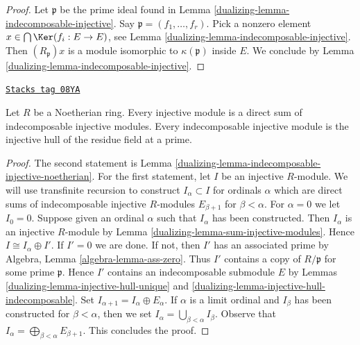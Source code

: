 \begin{proof}

Let $\mathfrak p$ be the prime ideal found in
Lemma \ref{dualizing-lemma-indecomposable-injective}.
Say $\mathfrak p = (f_1, \ldots, f_r)$.
Pick a nonzero element $x \in \bigcap \Ker(f_i : E \to E)$,
see Lemma \ref{dualizing-lemma-indecomposable-injective}.
Then $(R_\mathfrak p)x$ is a module isomorphic to $\kappa(\mathfrak p)$
inside $E$. We conclude by Lemma \ref{dualizing-lemma-indecomposable-injective}.
\end{proof}

\begin{proposition}

\label{dualizing-proposition-structure-injectives-noetherian}
\href{https://stacks.math.columbia.edu/tag/08YA}{\texttt{Stacks tag 08YA}}

Let $R$ be a Noetherian ring.
Every injective module is a direct sum of indecomposable injective modules.
Every indecomposable injective module is the injective hull of
the residue field at a prime.
\end{proposition}

\begin{proof}

The second statement is Lemma \ref{dualizing-lemma-indecomposable-injective-noetherian}.
For the first statement, let $I$ be an injective $R$-module.
We will use transfinite recursion to construct $I_\alpha \subset I$
for ordinals $\alpha$ which are direct sums of indecomposable injective
$R$-modules $E_{\beta + 1}$ for $\beta < \alpha$.
For $\alpha = 0$ we let $I_0 = 0$. Suppose given an ordinal $\alpha$
such that $I_\alpha$ has been constructed. Then $I_\alpha$ is an
injective $R$-module by Lemma \ref{dualizing-lemma-sum-injective-modules}.
Hence $I \cong I_\alpha \oplus I'$. If $I' = 0$ we are done.
If not, then $I'$ has an associated prime by
Algebra, Lemma \ref{algebra-lemma-ass-zero}.
Thus $I'$ contains a copy of $R/\mathfrak p$ for some prime $\mathfrak p$.
Hence $I'$ contains an indecomposable submodule $E$ by
Lemmas \ref{dualizing-lemma-injective-hull-unique} and
\ref{dualizing-lemma-injective-hull-indecomposable}. Set
$I_{\alpha + 1} = I_\alpha \oplus E_\alpha$.
If $\alpha$ is a limit ordinal and $I_\beta$ has been constructed
for $\beta < \alpha$, then we set
$I_\alpha = \bigcup_{\beta < \alpha} I_\beta$.
Observe that $I_\alpha = \bigoplus_{\beta < \alpha} E_{\beta + 1}$.
This concludes the proof.
\end{proof}

